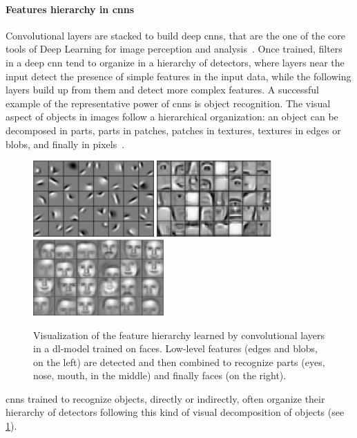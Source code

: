 \paragraph{Features hierarchy in \glspl{cnn}}
Convolutional layers are stacked to build deep \glspl{cnn}, that are the one of the core tools of Deep Learning for image perception and analysis~\cite{krizhevsky2012imagenet,sermanet2013overfeat,simonyan2014very,he2015delving,he2016deep,xie2017aggregated}.
Once trained, filters in a deep \gls{cnn} tend to organize in a hierarchy of detectors, where layers near the input detect the presence of simple features in the input data, while the following layers build up from them and detect more complex features.
A successful example of the representative power of \glspl{cnn} is object recognition.
The visual aspect of objects in images follow a hierarchical organization: an object can be decomposed in parts, parts in patches, patches in textures, textures in edges or blobs, and finally in pixels~\cite{}.
\begin{figure}
    \centering
    \includegraphics[height=2.9cm]{feat-hier-1.png}%
    \hfill%
    \includegraphics[height=2.9cm]{feat-hier-2.png}%
    \hfill%
    \includegraphics[height=2.9cm]{feat-hier-3.png}%
    \newline
    \caption{
    Visualization of the feature hierarchy learned by convolutional layers in a \gls{dl}-model trained on faces.
    Low-level features (edges and blobs, on the left) are detected and then combined to recognize parts (eyes, nose, mouth, in the middle) and finally faces (on the right).
    }
    \label{fig:back:filter-hier}
\end{figure}
\Glspl{cnn} trained to recognize objects, directly or indirectly, often organize their hierarchy of detectors following this kind of visual decomposition of objects (see \ref{fig:back:filter-hier}).


